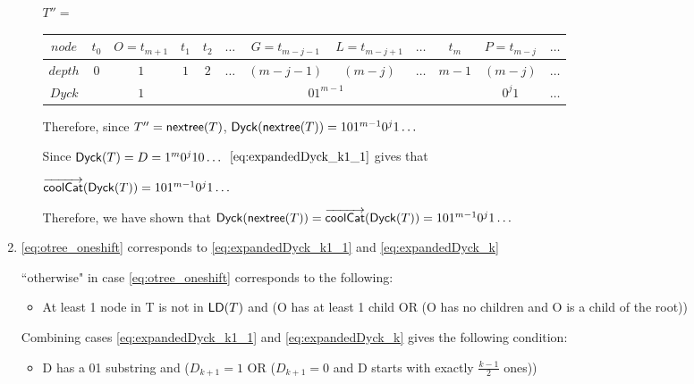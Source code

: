 \begin{enumerate}
\begin{itemize}
\bigskip
\bigskip


		$T''=$
		\begin{center}
		\begin{tabular}{ |c|c|c|c|c|c|c|c|c|c|c|c| } 
		 \hline

		    $node$ & $t_0$ & $O=t_{m+1}$ & $t_1$ & $t_2$ & $\dots$ & $G=t_{m-j-1}$ & $L=t_{m-j+1}$ & $\dots$ & $t_m$ & $P=t_{m-j}$ & $\dots$ \\
		 \hline
		    $depth$ & $0$ & $1$ & $1$ & $2$ &$\dots$ & $(m-j-1)$ & $(m-j)$ & $\dots$ & $m-1$ & $(m-j)$   & $\dots$\\
		 \hline
		    $Dyck$ &  & $1$ &  \multicolumn{7}{|c|}{$01^{m-1}$} &  $0^{j}1$   & $\dots$\\
		 \hline
		\end{tabular}
		\end{center}


		\bigskip
		\bigskip




		Therefore, since $T''=\mathsf{nextree}{(T)}$, $\mathsf{Dyck}{(\mathsf{nextree}{(T)})}=101^{m-1}0^j1\dots$

		Since $\mathsf{Dyck}{(T)}=D=1^m0^{j}10\dots$
		$\ref{eq:expandedDyck_k1_1}$ gives that

		$\overrightarrow{\mathsf{coolCat}}{(\mathsf{Dyck}{(T)})}=101^{m-1}0^j1\dots$

		Therefore, we have shown that $\mathsf{Dyck}{(\mathsf{nextree}{(T)})}=\overrightarrow{\mathsf{coolCat}}{(\mathsf{Dyck}{(T)})}=101^{m-1}0^j1\dots$
	\end{itemize}

    \item \ref{eq:otree_oneshift} corresponds to \ref{eq:expandedDyck_k1_1} and \ref{eq:expandedDyck_k}

	``otherwise" in case \ref{eq:otree_oneshift} corresponds to the following:
	\begin{itemize}
	    \item At least 1 node in T is not in $\mathsf{LD}{(T)}$ and (O has at least 1 child OR (O has no children and O is a child of the root))
	\end{itemize}

	Combining cases \ref{eq:expandedDyck_k1_1} and \ref{eq:expandedDyck_k} gives the following condition:
	\begin{itemize}
	    \item D has a 01 substring and ($D_{k+1}=1$ OR ($D_{k+1}=0$ and D starts with exactly $\frac{k-1}{2}$ ones))


\end{itemize}
\end{enumerate}
